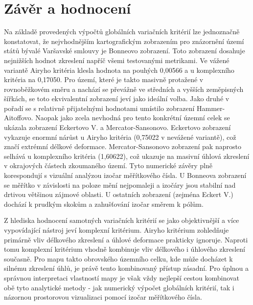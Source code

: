 \section*{Závěr a hodnocení}
Na základě provedených výpočtů globálních variačních kritérií lze jednoznačně konstatovat, že nejvhodnějším kartografickým zobrazením pro znázornění území států bývalé Varšavské smlouvy je Bonneovo zobrazení.
Toto zobrazení dosahuje nejnižších hodnot zkreslení napříč všemi testovanými metrikami.
Ve vážené variantě Airyho kritéria klesla hodnota na pouhých 0,00566 a u komplexního kritéria na 0,17050.
Pro území, které je takto masivně protažené v rovnoběžkovém směru a nachází se převážně ve středních a vyšších zeměpisných šířkách, se toto ekvivalentní zobrazení jeví jako ideální volba.
Jako druhé v pořadí se s relativně přijatelnými hodnotami umístilo zobrazení Hammer-Aitoffovo. 
Naopak jako zcela nevhodná pro tento konkrétní územní celek se ukázala zobrazení Eckertovo V. a Mercator-Sansonovo.
Eckertovo zobrazení vykazuje enormní nárůst u Airyho kritéria (0,75022 v nevážené variantě), což značí extrémní délkové deformace.
Mercator-Sansonovo zobrazení pak naprosto selhává u komplexního kritéria (1,60622), což ukazuje na masivní úhlová zkreslení v okrajových částech zkoumaného území.
Tyto numerické závěry plně korespondují s vizuální analýzou izočar měřítkového čísla.
U Bonneova zobrazení se měřítko v závislosti na poloze mění nejpomaleji a izočáry jsou stabilní nad drtivou většinou zájmové oblasti.
U ostatních zobrazení (zejména Eckert V.) dochází k prudkým skokům a zahušťování izočar směrem k pólům.

Z hlediska hodnocení samotných variačních kritérií se jako objektivnější a více vypovídající nástroj jeví komplexní kritérium.
Airyho kritérium zohledňuje primárně vliv délkového zkreslení a úhlové deformace prakticky ignoruje.
Naproti tomu komplexní kritérium vhodně kombinuje vliv délkového i úhlového zkreslení současně.
Pro mapu takto obrovského územního celku, kde může docházet k silnému zkreslení úhlů, je právě tento kombinovaný přístup zásadní.
Pro úplnou a správnou interpretaci vlastností mapy je však vždy nejlepší cestou kombinovat obě tyto analytické metody - jak numerický výpočet globálních kritérií, tak i názornou prostorovou vizualizaci pomocí izočar měřítkového čísla. 